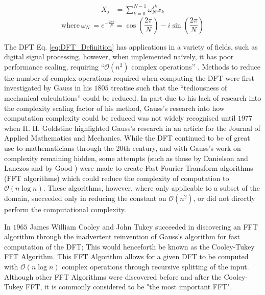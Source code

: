 \begin{align}
    X_j &= \sum_{k=0}^{N-1}\omega_N^{jk}x_k\label{eq:DFT_Definition}
\end{align}
\begin{equation}
    \text{where}~\omega_N~=e^{-\frac{2\pi i}{N}}
    = \cos{\left(\frac{2\pi}{N}\right)}-i\sin{\left(\frac{2\pi}{N}\right)}\label{eq:ComplexRootsOfUnity}
\end{equation}

The DFT Eq. \ref{eq:DFT_Definition} has applications in a variety of fields, such as digital signal processing\cite{Bellanger2024}, however, when implemented naïvely, it has poor performance scaling, requiring  
``$\mathcal{O}\left(n^2\right)$ complex operations'' \cite{VanLoan1992}.
Methods to reduce the number of complex operations required when computing the DFT were first investigated by Gauss in his $1805$ treatise such that the ``tediousness of mechanical calculations''\cite{Gauss1866} could be reduced.\cite{Heideman1985}
In part due to his lack of research into the complexity scaling factor of his method, Gauss's research into how computation complexity could be reduced was not widely recognised until $1977$ when H. H. Goldstine highlighted Gauss's research in an article for the Journal of Applied Mathematics and Mechanics.\cite{Heideman1985}\cite{Heinrich1980}
While the DFT continued to be of great use to mathematicians through the 20th century, and with Gauss's work on complexity remaining hidden, some attempts (such as those by Danielson and Lanczos \cite{Danielson1942} and by Good \cite{Good1958}) were made to create Fast Fourier Transform algorithms (FFT algorithms) which could reduce the complexity of computation to $\mathcal{O}\left(n\log n\right)$.
These algorithms, however, where only applicable to a subset of the domain\cite{Good1958}, succeeded only in reducing the constant on $\mathcal{O}\left(n^2\right)$, or did not directly perform the computational complexity\cite{Danielson1942}.

In $1965$ James William Cooley and John Tukey succeeded in discovering an FFT algorithm through the inadvertent reinvention of Gauss's algorithm for fast computation of the DFT; This would henceforth be known as the Cooley-Tukey FFT Algorithm.\cite{Cooley1965}\cite{Heideman1985}
This FFT Algorithm allows for a given DFT to be computed with $\mathcal{O}\left(n\log n\right)$ complex operations through recursive splitting of the input.\cite{Cooley1965}
Although other FFT Algorithms were discovered before and after the Cooley-Tukey FFT, it is commonly considered to be "the most important FFT"\cite{Frigo2005}.

